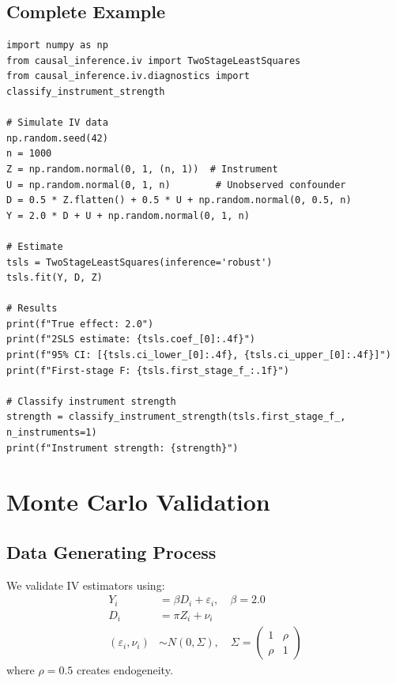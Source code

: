 \subsection{Complete Example}

\begin{verbatim}
import numpy as np
from causal_inference.iv import TwoStageLeastSquares
from causal_inference.iv.diagnostics import classify_instrument_strength

# Simulate IV data
np.random.seed(42)
n = 1000
Z = np.random.normal(0, 1, (n, 1))  # Instrument
U = np.random.normal(0, 1, n)        # Unobserved confounder
D = 0.5 * Z.flatten() + 0.5 * U + np.random.normal(0, 0.5, n)
Y = 2.0 * D + U + np.random.normal(0, 1, n)

# Estimate
tsls = TwoStageLeastSquares(inference='robust')
tsls.fit(Y, D, Z)

# Results
print(f"True effect: 2.0")
print(f"2SLS estimate: {tsls.coef_[0]:.4f}")
print(f"95% CI: [{tsls.ci_lower_[0]:.4f}, {tsls.ci_upper_[0]:.4f}]")
print(f"First-stage F: {tsls.first_stage_f_:.1f}")

# Classify instrument strength
strength = classify_instrument_strength(tsls.first_stage_f_, n_instruments=1)
print(f"Instrument strength: {strength}")
\end{verbatim}


\section{Monte Carlo Validation}
\label{sec:iv_validation}

\subsection{Data Generating Process}

We validate IV estimators using:
\begin{align}
Y_i &= \beta D_i + \varepsilon_i, \quad \beta = 2.0 \\
D_i &= \pi Z_i + \nu_i \\
(\varepsilon_i, \nu_i) &\sim N(0, \Sigma), \quad \Sigma = \begin{pmatrix} 1 & \rho \\ \rho & 1 \end{pmatrix}
\end{align}
where $\rho = 0.5$ creates endogeneity.


